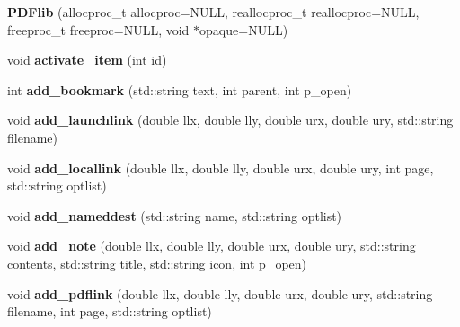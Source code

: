 \begin{DoxyCompactItemize}
\item 
\hypertarget{classPDFlib_a63a60e9b1c4c18e6db742f85011510f3}{{\bfseries \-P\-D\-Flib} (allocproc\-\_\-t allocproc=\-N\-U\-L\-L, reallocproc\-\_\-t reallocproc=\-N\-U\-L\-L, freeproc\-\_\-t freeproc=\-N\-U\-L\-L, void $\ast$opaque=\-N\-U\-L\-L)}\label{classPDFlib_a63a60e9b1c4c18e6db742f85011510f3}

\item 
\hypertarget{classPDFlib_a83cf7a11d217af0e33e6dca6267965c4}{void {\bfseries activate\-\_\-item} (int id)}\label{classPDFlib_a83cf7a11d217af0e33e6dca6267965c4}

\item 
\hypertarget{classPDFlib_afbf7e219b67e0099610963c1ca9b6dca}{int {\bfseries add\-\_\-bookmark} (std\-::string text, int parent, int p\-\_\-open)}\label{classPDFlib_afbf7e219b67e0099610963c1ca9b6dca}

\item 
\hypertarget{classPDFlib_a32faa0f4597b6dceacd54a4a5497823d}{void {\bfseries add\-\_\-launchlink} (double llx, double lly, double urx, double ury, std\-::string filename)}\label{classPDFlib_a32faa0f4597b6dceacd54a4a5497823d}

\item 
\hypertarget{classPDFlib_a2d47dcbd27a69e9c1c02ca608f927ab7}{void {\bfseries add\-\_\-locallink} (double llx, double lly, double urx, double ury, int page, std\-::string optlist)}\label{classPDFlib_a2d47dcbd27a69e9c1c02ca608f927ab7}

\item 
\hypertarget{classPDFlib_a16845662dabe0494d69b016846f2adcc}{void {\bfseries add\-\_\-nameddest} (std\-::string name, std\-::string optlist)}\label{classPDFlib_a16845662dabe0494d69b016846f2adcc}

\item 
\hypertarget{classPDFlib_ab054c136755f297058ac9812adefafec}{void {\bfseries add\-\_\-note} (double llx, double lly, double urx, double ury, std\-::string contents, std\-::string title, std\-::string icon, int p\-\_\-open)}\label{classPDFlib_ab054c136755f297058ac9812adefafec}

\item 
\hypertarget{classPDFlib_acc2002bc0e060620bfe97eae7dcc9371}{void {\bfseries add\-\_\-pdflink} (double llx, double lly, double urx, double ury, std\-::string filename, int page, std\-::string optlist)}\label{classPDFlib_acc2002bc0e060620bfe97eae7dcc9371}


\end{DoxyCompactItemize}
